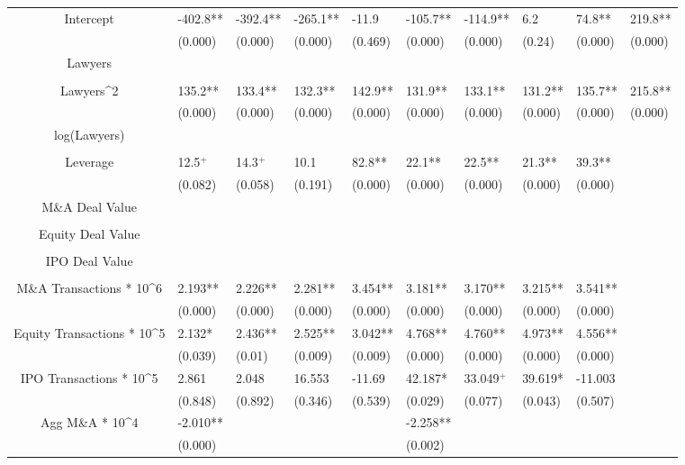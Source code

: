 \documentclass{article}
\begin{document}
\begin{table}[H]
\begin{tabular}{|clllllllll|}
Intercept & -402.8** & -392.4** & -265.1** & -11.9 & -105.7** & -114.9** & 6.2 & 74.8** & 219.8** \\
   & (0.000) & (0.000) & (0.000) & (0.469) & (0.000) & (0.000) & (0.24) & (0.000) & (0.000) \\
  Lawyers &  &  &  &  &  &  &  &  &  \\
   &  &  &  &  &  &  &  &  &  \\
  Lawyers^2 & 135.2** & 133.4** & 132.3** & 142.9** & 131.9** & 133.1** & 131.2** & 135.7** & 215.8** \\
   & (0.000) & (0.000) & (0.000) & (0.000) & (0.000) & (0.000) & (0.000) & (0.000) & (0.000) \\
  log(Lawyers) &  &  &  &  &  &  &  &  &  \\
   &  &  &  &  &  &  &  &  &  \\
  Leverage & 12.5$^{+}$ & 14.3$^{+}$ & 10.1 & 82.8** & 22.1** & 22.5** & 21.3** & 39.3** &  \\
   & (0.082) & (0.058) & (0.191) & (0.000) & (0.000) & (0.000) & (0.000) & (0.000) &  \\
  M\&A Deal Value &  &  &  &  &  &  &  &  &  \\
   &  &  &  &  &  &  &  &  &  \\
  Equity Deal Value &  &  &  &  &  &  &  &  &  \\
   &  &  &  &  &  &  &  &  &  \\
  IPO Deal Value &  &  &  &  &  &  &  &  &  \\
   &  &  &  &  &  &  &  &  &  \\
  M\&A Transactions * 10^6 & 2.193** & 2.226** & 2.281** & 3.454** & 3.181** & 3.170** & 3.215** & 3.541** &  \\
   & (0.000) & (0.000) & (0.000) & (0.000) & (0.000) & (0.000) & (0.000) & (0.000) &  \\
  Equity Transactions * 10^5 & 2.132* & 2.436** & 2.525** & 3.042** & 4.768** & 4.760** & 4.973** & 4.556** &  \\
   & (0.039) & (0.01) & (0.009) & (0.009) & (0.000) & (0.000) & (0.000) & (0.000) &  \\
  IPO Transactions * 10^5 & 2.861 & 2.048 & 16.553 & -11.69 & 42.187* & 33.049$^{+}$ & 39.619* & -11.003 &  \\
   & (0.848) & (0.892) & (0.346) & (0.539) & (0.029) & (0.077) & (0.043) & (0.507) &  \\
  Agg M\&A * 10^4 & -2.010** &  &  &  & -2.258** &  &  &  &  \\
   & (0.000) &  &  &  & (0.002) &  &  &  &  \\

\end{tabular}
\end{table}
\end{document}
